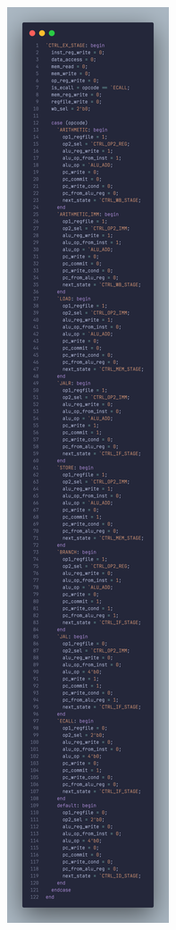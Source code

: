 \documentclass{scrartcl}
\begin{document}
\begin{center}
  \includegraphics[scale=0.15]{code_screenshot/control_unit_2.png}

\end{center}
\end{document}
